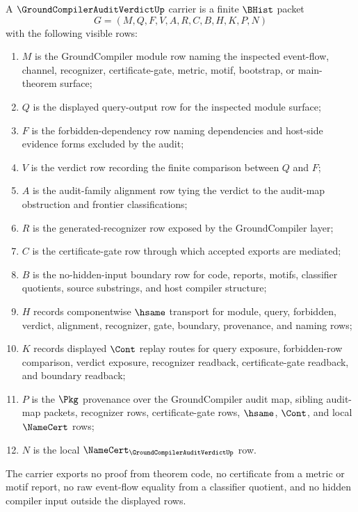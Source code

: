 \begin{definition}
\label{def:groundcompiler-audit-verdict-carrier}
A $\GroundCompilerAuditVerdictUp$ carrier is a finite $\BHist$ packet
$$
G=(M,Q,F,V,A,R,C,B,H,K,P,N)
$$
with the following visible rows:
\begin{enumerate}
\item $M$ is the GroundCompiler module row naming the inspected event-flow, channel, recognizer, certificate-gate, metric, motif, bootstrap, or main-theorem surface;
\item $Q$ is the displayed query-output row for the inspected module surface;
\item $F$ is the forbidden-dependency row naming dependencies and host-side evidence forms excluded by the audit;
\item $V$ is the verdict row recording the finite comparison between $Q$ and $F$;
\item $A$ is the audit-family alignment row tying the verdict to the audit-map obstruction and frontier classifications;
\item $R$ is the generated-recognizer row exposed by the GroundCompiler layer;
\item $C$ is the certificate-gate row through which accepted exports are mediated;
\item $B$ is the no-hidden-input boundary row for code, reports, motifs, classifier quotients, source substrings, and host compiler structure;
\item $H$ records componentwise $\hsame$ transport for module, query, forbidden, verdict, alignment, recognizer, gate, boundary, provenance, and naming rows;
\item $K$ records displayed $\Cont$ replay routes for query exposure, forbidden-row comparison, verdict exposure, recognizer readback, certificate-gate readback, and boundary readback;
\item $P$ is the $\Pkg$ provenance over the GroundCompiler audit map, sibling audit-map packets, recognizer rows, certificate-gate rows, $\hsame$, $\Cont$, and local $\NameCert$ rows;
\item $N$ is the local $\NameCert_{\GroundCompilerAuditVerdictUp}$ row.
\end{enumerate}
The carrier exports no proof from theorem code, no certificate from a metric or motif report, no raw event-flow equality from a classifier quotient, and no hidden compiler input outside the displayed rows.
\end{definition}

